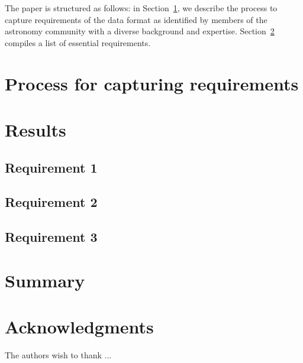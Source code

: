 \documentclass[final,authoryear,5p,times,twocolumn]{elsarticle}
\begin{document}
The paper is structured as follows: in Section~\ref{sec:process}, we describe
the process to capture requirements of the data format as identified by members
of the astronomy community with a diverse background and expertise.
Section~\ref{sec:results} compiles a list of essential requirements.

\section{Process for capturing requirements}
\label{sec:process}

\section{Results}
\label{sec:results}

\subsection{Requirement 1}
\label{sec:req_1}

\subsection{Requirement 2}
\label{sec:req_2}

\subsection{Requirement 3}
\label{sec:req_3}

\section{Summary}
\label{sec:summary}

\section{Acknowledgments}


The authors wish to thank ...



\end{document}
